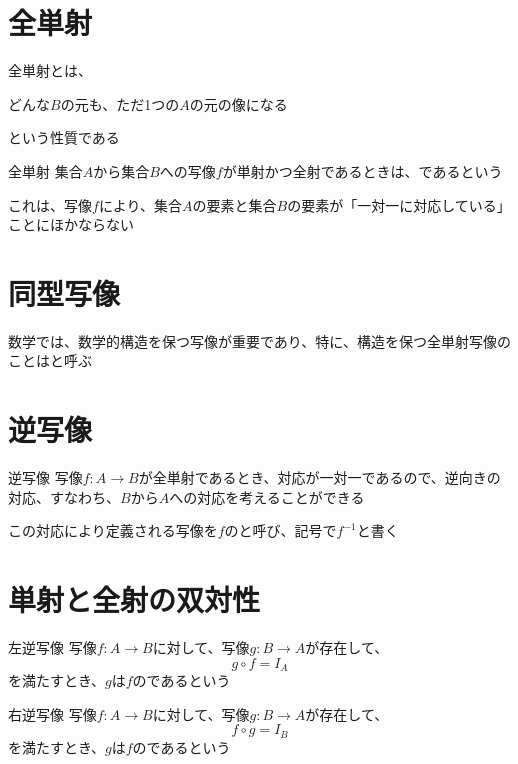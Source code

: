 \documentclass[../../../topic_mapping]{subfiles}
\begin{document}
\sectionline
\section{全単射}

全単射とは、
\begin{shaded}
  どんな$B$の元も、ただ1つの$A$の元の像になる
\end{shaded}
という性質である

\begin{definition}{全単射}
  集合$A$から集合$B$への写像$f$が単射かつ全射であるときは、であるという
\end{definition}

これは、写像$f$により、集合$A$の要素と集合$B$の要素が「一対一に対応している」ことにほかならない

\sectionline
\section{同型写像}

数学では、数学的構造を保つ写像が重要であり、特に、構造を保つ全単射写像のことはと呼ぶ

\sectionline
\section{逆写像}

\begin{definition}{逆写像}
  写像$f\colon A \to B$が全単射であるとき、対応が一対一であるので、逆向きの対応、すなわち、$B$から$A$への対応を考えることができる

  この対応により定義される写像を$f$のと呼び、記号で$f^{-1}$と書く
\end{definition}

\sectionline
\section{単射と全射の双対性}

\begin{definition}{左逆写像}
  写像$f\colon A \to B$に対して、写像$g\colon B \to A$が存在して、
  \begin{equation*}
    g \circ f = I_A
  \end{equation*}
  を満たすとき、$g$は$f$のであるという
\end{definition}

\begin{definition}{右逆写像}
  写像$f\colon A \to B$に対して、写像$g\colon B \to A$が存在して、
  \begin{equation*}
    f \circ g = I_B
  \end{equation*}
  を満たすとき、$g$は$f$のであるという
\end{definition}
\end{document}
